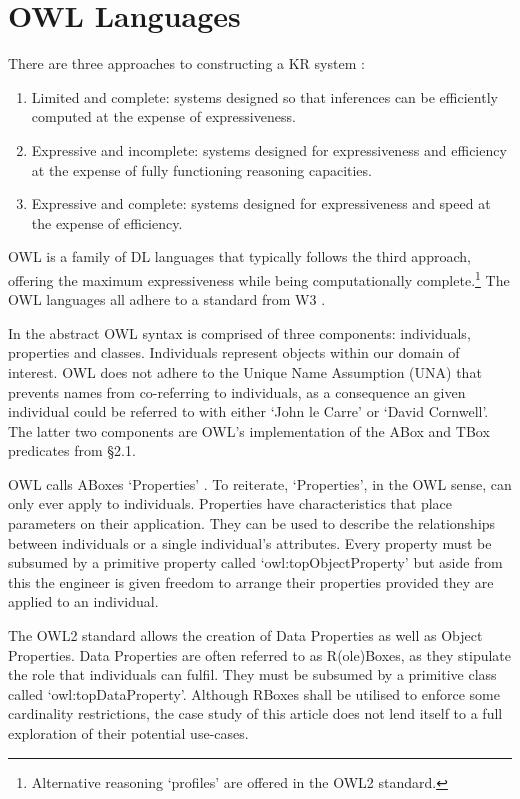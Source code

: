 \documentclass[titlepage,a4paper,12pt,oneside]{book}
\begin{document}
\section{OWL Languages}
There are three approaches to constructing a KR system \cite[23]{handbookIntro2003}:
\begin{enumerate}
\item{Limited and complete: systems designed so that inferences can be efficiently computed at the expense of expressiveness.}
\item{Expressive and incomplete: systems designed for expressiveness and efficiency at the expense of fully functioning reasoning capacities.}
\item{Expressive and complete: systems designed for expressiveness and speed at the expense of efficiency.}
\end{enumerate}
OWL is a family of DL languages that typically follows the third approach, offering the maximum expressiveness while being computationally complete.\footnote{Alternative reasoning `profiles' are offered in the OWL2 standard.}
The OWL languages all adhere to a standard from W3 \cite[10]{guide2011}.\par
In the abstract OWL syntax is comprised of three components: individuals, properties and classes.
Individuals represent objects within our domain of interest.
OWL does not adhere to the Unique Name Assumption (UNA) that prevents names from co-referring to individuals, as a consequence an given individual could be referred to with either `John le Carre' or `David Cornwell'.
The latter two components are OWL's implementation of the ABox and TBox predicates from §2.1.\par
OWL calls ABoxes `Properties' \cite[11]{guide2011}.
To reiterate, `Properties', in the OWL sense, can only ever apply to individuals.
Properties have characteristics that place parameters on their application.
They can be used to describe the relationships between individuals or a single individual's attributes.
Every property must be subsumed by a primitive property called `owl:topObjectProperty' but aside from this the engineer is given freedom to arrange their properties provided they are applied to an individual.\par
The OWL2 standard allows the creation of Data Properties as well as Object Properties.
Data Properties are often referred to as R(ole)Boxes, as they stipulate the role that individuals can fulfil.
They must be subsumed by a primitive class called `owl:topDataProperty'.
Although RBoxes shall be utilised to enforce some cardinality restrictions, the case study of this article does not lend itself to a full exploration of their potential use-cases.\par
\end{document}
